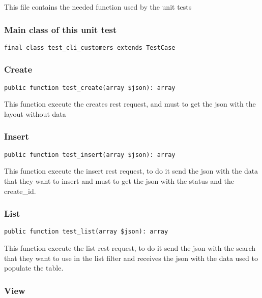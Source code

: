 \documentclass[a4paper]{article}
\begin{document}
This file contains the needed function used by the unit tests

\hypertarget{toc12}{}
\subsubsection{Main class of this unit test}

\begin{lstlisting}
final class test_cli_customers extends TestCase
\end{lstlisting}

\hypertarget{toc13}{}
\subsubsection{Create}

\begin{lstlisting}
public function test_create(array $json): array
\end{lstlisting}

This function execute the creates rest request, and must to get the
json with the layout without data

\hypertarget{toc14}{}
\subsubsection{Insert}

\begin{lstlisting}
public function test_insert(array $json): array
\end{lstlisting}

This function execute the insert rest request, to do it send the json with
the data that they want to insert and must to get the json with the status
and the create\_id.

\hypertarget{toc15}{}
\subsubsection{List}

\begin{lstlisting}
public function test_list(array $json): array
\end{lstlisting}

This function execute the list rest request, to do it send the json with
the search that they want to use in the list filter and receives the json
with the data used to populate the table.

\hypertarget{toc16}{}
\subsubsection{View}
\end{document}
